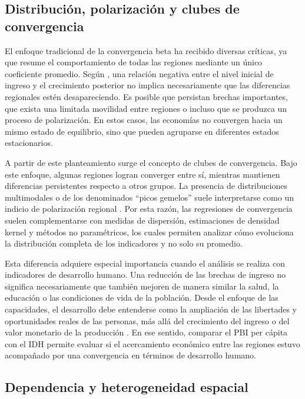 \subsection{Distribución, polarización y clubes de convergencia}

El enfoque tradicional de la convergencia beta ha recibido diversas críticas,
ya que resume el comportamiento de todas las regiones mediante un único
coeficiente promedio. Según \textcite{quah1993}, una relación negativa entre el
nivel inicial de ingreso y el crecimiento posterior no implica necesariamente
que las diferencias regionales estén desapareciendo. Es posible que persistan
brechas importantes, que exista una limitada movilidad entre regiones o incluso
que se produzca un proceso de polarización. En estos casos, las economías no
convergen hacia un mismo estado de equilibrio, sino que pueden agruparse en
diferentes estados estacionarios.

A partir de este planteamiento surge el concepto de clubes de convergencia. Bajo
este enfoque, algunas regiones logran converger entre sí, mientras mantienen
diferencias persistentes respecto a otros grupos. La presencia de distribuciones
multimodales o de los denominados ``picos gemelos'' suele interpretarse como un
indicio de polarización regional \parencite{quah1996}. Por esta razón, las
regresiones de convergencia suelen complementarse con medidas de dispersión,
estimaciones de densidad kernel y métodos no paramétricos, los cuales permiten
analizar cómo evoluciona la distribución completa de los indicadores y no solo
su promedio.

Esta diferencia adquiere especial importancia cuando el análisis se realiza con
indicadores de desarrollo humano. Una reducción de las brechas de ingreso no
significa necesariamente que también mejoren de manera similar la salud, la
educación o las condiciones de vida de la población. Desde el enfoque de las
capacidades, el desarrollo debe entenderse como la ampliación de las libertades
y oportunidades reales de las personas, más allá del crecimiento del ingreso o
del valor monetario de la producción \parencite{sen1999}. En ese sentido,
comparar el PBI per cápita con el IDH permite evaluar si el acercamiento
económico entre las regiones estuvo acompañado por una convergencia en términos
de desarrollo humano.

\subsection{Dependencia y heterogeneidad espacial}

